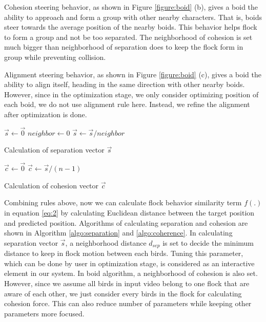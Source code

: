 Cohesion steering behavior, as shown in Figure \ref{figure:boid} (b), gives a boid the ability to approach and form a group with other nearby characters. That is, boids steer towards the average position of the nearby boids. This behavior helps flock to form a group and not be too separated. The neighborhood of cohesion is set much bigger than neighborhood of separation does to keep the flock form in group while preventing collision.


Alignment steering behavior, as shown in Figure \ref{figure:boid} (c), gives a boid the ability to align itself, heading in the same direction with other nearby boids. However, since in the optimization stage, we only consider optimizing position of each boid, we do not use alignment rule here. Instead, we refine the alignment after optimization is done.


\begin{algorithm}[h]
\SetAlgoLined
{}
$\vec{s} \leftarrow \vec{0}$ \;
$neighbor \leftarrow 0 $ \;
$\vec{s} \leftarrow \vec{s} / neighbor$ \;
\caption{Calculation of separation vector $\vec{s}$}
\label{algo:separation}
\end{algorithm}


\begin{algorithm}[h]
\SetAlgoLined
{}
$\vec{c} \leftarrow \vec{0}$ \;
$\vec{c} \leftarrow \vec{s} / (n-1)$ \;
\caption{Calculation of cohesion vector $\vec{c}$}
\label{algo:coherence}
\end{algorithm}


Combining rules above, now we can calculate flock behavior similarity term $f(.)$ in equation \ref{eq:2} by calculating Euclidean distance between the target position and predicted position. Algorithms of calculating separation and cohesion are shown in Algorithm \ref{algo:separation} and \ref{algo:coherence}. In calculating separation vector $\vec{s}$, a neighborhood distance $d_{sep}$ is set to decide the minimum distance to keep in flock motion between each birds. Tuning this parameter, which can be done by user in optimization stage, is considered as an interactive element in our system. In boid algorithm, a neighborhood of cohesion is also set. However, since we assume all birds in input video belong to one flock that are aware of each other, we just consider every birds in the flock for calculating cohesion force. This can also reduce number of parameters while keeping other parameters more focused.


